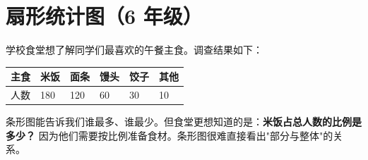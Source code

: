 \section*{扇形统计图（6 年级）}


\begin{explore}


学校食堂想了解同学们最喜欢的午餐主食。调查结果如下：

\begin{center}
\begin{tabular}{llllll}
\toprule
主食 & 米饭 & 面条 & 馒头 & 饺子 & 其他 \\
\midrule
人数 & 180 & 120 & 60 & 30 & 10 \\
\bottomrule
\end{tabular}
\end{center}


条形图能告诉我们谁最多、谁最少。但食堂更想知道的是：\textbf{米饭占总人数的比例是多少？} 因为他们需要按比例准备食材。条形图很难直接看出"部分与整体"的关系。

\end{explore}

